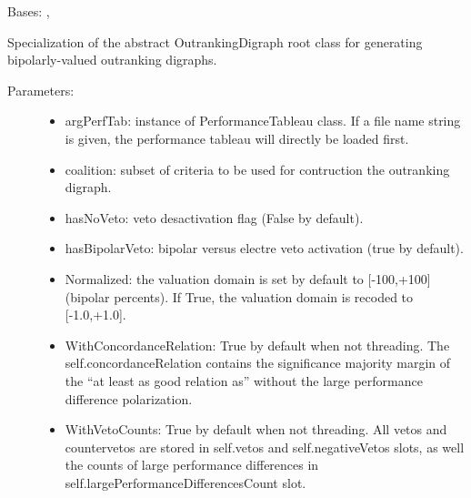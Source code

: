 \documentclass[letterpaper,10pt,english]{sphinxmanual}
\begin{document}
\begin{fulllineitems}
\label{techDoc:outrankingDigraphs.BipolarOutrankingDigraph}
Bases: {\hyperref[techDoc:outrankingDigraphs.OutrankingDigraph]{\emph{}}}, {\hyperref[techDoc:perfTabs.PerformanceTableau]{\emph{}}}

Specialization of the abstract OutrankingDigraph root class for generating
bipolarly-valued outranking digraphs.
\begin{description}
\item[{Parameters:}] \leavevmode\begin{itemize}
\item {} 
argPerfTab: instance of PerformanceTableau class.
If a file name string is given, the performance tableau will directly be loaded first.

\item {} 
coalition: subset of criteria to be used for contruction the outranking digraph.

\item {} 
hasNoVeto: veto desactivation flag (False by default).

\item {} 
hasBipolarVeto: bipolar versus electre veto activation (true by default).

\item {} 
Normalized: the valuation domain is set by default to {[}-100,+100{]} (bipolar percents).
If True, the valuation domain is recoded to {[}-1.0,+1.0{]}.

\item {} 
WithConcordanceRelation: True by default when not threading.
The self.concordanceRelation contains the significance majority margin of the ``at least as good relation as''
without the large performance difference polarization.

\item {} 
WithVetoCounts: True by default when not threading. All vetos and countervetos
are stored in self.vetos and self.negativeVetos slots,
as well the counts of large performance differences in self.largePerformanceDifferencesCount slot.


\end{itemize}
\end{description}
\end{fulllineitems}
\end{document}
